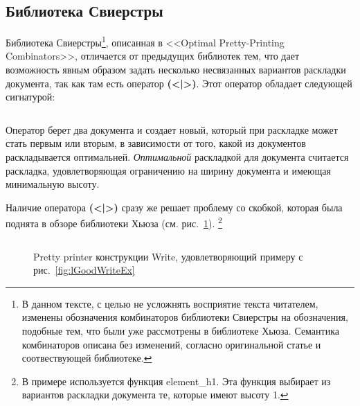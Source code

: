 \newpage

\subsection{Библиотека Свиерстры}

Библиотека Свиерстры\footnote{
В данном тексте, с целью не усложнять восприятие текста читателем, изменены обозначения комбинаторов библиотеки Свиерстры на обозначения, подобные тем, что были уже рассмотрены в библиотеке Хьюза. Семантика комбинаторов описана без изменений, согласно оригинальной статье и соотвествующей библиотеке.
}, описанная в <<Optimal Pretty-Printing Combinators>>\cite{swierstra}, отличается от предыдущих библиотек тем, что дает возможность явным образом задать несколько несвязанных вариантов раскладки документа, так как там есть оператор \textbf{(<|>)}. Этот оператор обладает следующей сигнатурой:
\inputminted{haskell}{codes/chooseSw.hs}
Оператор берет два документа и создает новый, который при раскладке может стать первым или вторым, в зависимости от того, какой из документов раскладывается оптимальней. \textit{Оптимальной} раскладкой для документа считается раскладка, удовлетворяющая ограничению на ширину документа и имеющая минимальную высоту.

Наличие оператора \textbf{(<|>)} сразу же решает проблему со скобкой, которая была поднята в обзоре библиотеки Хьюза (см. рис.~\ref{fig:bracketSwierstra}).
\footnote{
	В примере используется функция element\_h1. Эта функция выбирает из вариантов раскладки документа те, которые имеют высоту 1.
}

\begin{figure}[h!]
	\inputminted{haskell}{codes/bracketSwierstra.hs}
	\caption{Pretty printer конструкции Write, удовлетворяющий примеру с рис.~\ref{fig:lGoodWriteEx}}
	\label{fig:bracketSwierstra}
\end{figure}


